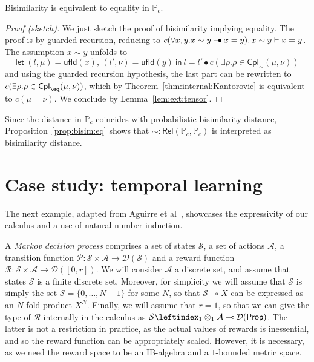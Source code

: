 \documentclass[a4paper,UKenglish,cleveref, autoref, thm-restate]{lipics-v2021}
\newcommand{\lol}{\mathbin{\multimap}}
\newcommand{\mexp}{\lol}
\newcommand{\D}{\mathcal{D}}
\newcommand{\pair}[2]{\otimes_{#1,#2}}
\renewcommand{\pair}[2]{\leftindex_{#1}\otimes_{#2}} %
\newcommand{\Proc}[1][\discfact]{\mathbb{P}_{#1}}
\newcommand{\Act}{\mathcal A}
\newcommand{\State}{\mathcal S}
\newcommand{\trans}{\mathcal P}
\newcommand{\reward}{\mathcal R}
\newcommand{\letIn}[2]{\mathsf{let~} #1 \mathsf{~in~} #2}
\newcommand{\Prop}{\mathsf{Prop}}
\newcommand{\ltensor}{*}
\renewcommand{\ltensor}{\bullet}
\newcommand{\lexp}{\mathbin{{-}\kern-.2em\raisebox{0ex}{$*$}}}
\renewcommand{\lexp}{\mathbin{{-}\kern-.2em\raisebox{0ex}{$\bullet$}}}
\newcommand{\unfold}{\mathsf{ufld}}
\newcommand{\TD}{\mathcal{D}}
\newcommand{\coup}[4]{#2 \in \mathsf{Cpl}_{#1}(#3,#4)}
\newcommand{\Rel}[2]{\mathsf{Rel}(#1,#2)}
\newcommand{\bisim}{\sim} %
\newcommand{\discfact}{c} %
\newcommand{\peq}{=}
\begin{document}
\begin{proposition} \label{prop:bisim:eq}
  Bisimilarity is equivalent to equality in $\Proc$.
\end{proposition}

\begin{proof}[Proof (sketch)] 
 We just sketch the proof of bisimilarity implying equality. The proof is by guarded recursion, 
 reducing to  
 $\discfact(\forall x,y . x\bisim y \lexp x \peq y), x \bisim y \vdash x\peq y$. The assumption $x \bisim y$ unfolds to
 \[
 \letIn{(l, \mu) = \unfold(x), \,
    (l', \nu) = \unfold(y)}{
   l \peq l' \ltensor \discfact( \exists \rho . \coup{\bisim}\rho\mu\nu})
 \]
 and using the guarded recursion hypothesis, the last part can be rewritten to 
 $\discfact(\exists \rho . \coup{\eq}\rho\mu\nu)$, which by Theorem~\ref{thm:internal:Kantorovic} is equivalent to 
 $\discfact(\mu \peq \nu)$. We conclude by Lemma~\ref{lem:ext:tensor}.
\end{proof}

Since the distance in $\Proc$ coincides with probabilistic bisimilarity distance, 
Proposition~\ref{prop:bisim:eq} shows that ${\bisim} : \Rel \Proc\Proc$ is interpreted as 
bisimilarity distance. 

\section{Case study: temporal learning}
\label{sec:temporal:learning}

The next example, adapted from Aguirre et al~\cite{BHKKM21}, showcases the expressivity of our calculus and a use of natural number induction. 

A \emph{Markov decision process} comprises a set of states $\State$, a set of actions $\Act$, a transition function $\trans \colon \State \times \Act \to \D(\State)$ and
a reward function $\reward \colon \State \times \Act \to \D([0,r])$. We will consider $\Act$ a discrete set, 
and assume that states $\State$ is a finite discrete set. Moreover, for simplicity we will assume that $\State$ is simply the set
$\State =\{0, \dots, N-1\}$ for some $N$, so that $\State \mexp X$ can be expressed as an $N$-fold product $X^N$. Finally, we will assume that 
$r=1$, so that we can give the type of $\reward$ internally in the calculus as $\State \pair11\Act \lol \TD(\Prop)$. The latter is not a 
restriction in practice, as the actual values of rewards is inessential, and so the reward function can be appropriately scaled. However, it is necessary, as we 
need the reward space to be an IB-algebra and a $1$-bounded metric space. 
\end{document}
